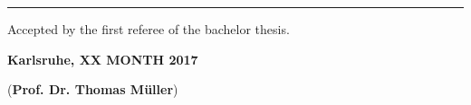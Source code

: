 \vspace*{\fill}

\rule{1.0\textwidth}{0.6pt}

\vspace*{0.75em}

Accepted by the first referee of the bachelor thesis.

\textbf{Karlsruhe, XX MONTH 2017}

\vspace*{4em}

\dotfill \hspace*{8cm} 

\hspace*{0.82cm}(\textbf{Prof. Dr. Thomas Müller})
